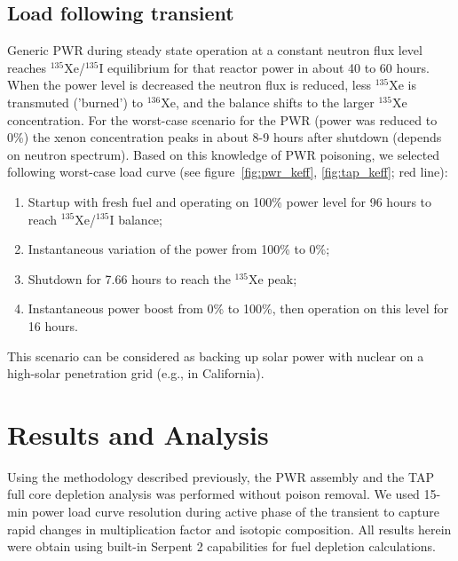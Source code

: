 \documentclass{anstrans}
\begin{document}
\subsection{Load following transient}
Generic \gls{PWR} during steady state operation at a constant neutron flux 
level reaches $^{135}$Xe/$^{135}$I equilibrium for that reactor power in about 
40 to 60 hours. When the power level is decreased the neutron flux is reduced, 
less $^{135}$Xe is transmuted ('burned') to $^{136}$Xe, and the balance shifts 
to the larger $^{135}$Xe concentration. For the worst-case scenario for the 
\gls{PWR} (power was reduced to 0\%) the xenon concentration peaks in about 
8-9 hours after shutdown (depends on neutron spectrum). Based on this 
knowledge of \gls{PWR} poisoning, we selected following worst-case load curve 
(see figure~\ref{fig:pwr_keff}, 
\ref{fig:tap_keff}; red line):
\begin{enumerate}
	\item Startup with fresh fuel and operating on 
	100\% power level for 96 hours to reach $^{135}$Xe/$^{135}$I balance;
	\item Instantaneous variation of the power from 100\% to 0\%;
	\item Shutdown for 7.66 hours to reach the $^{135}$Xe peak;
	\item Instantaneous power boost from 0\% to 100\%, then operation on 
	this level for 16 hours.
\end{enumerate}
This scenario can be considered as backing up solar power with nuclear on a 
high-solar penetration grid (e.g., in California).

\section{Results and Analysis}
Using the methodology described previously, the \gls{PWR} assembly and 
the \gls{TAP} full core depletion analysis was performed without poison 
removal. 
We used 15-min power load curve resolution during active phase of the 
transient to capture rapid changes in multiplication factor and isotopic 
composition. All results herein were obtain using built-in Serpent 2 
capabilities for fuel depletion calculations.
\end{document}
